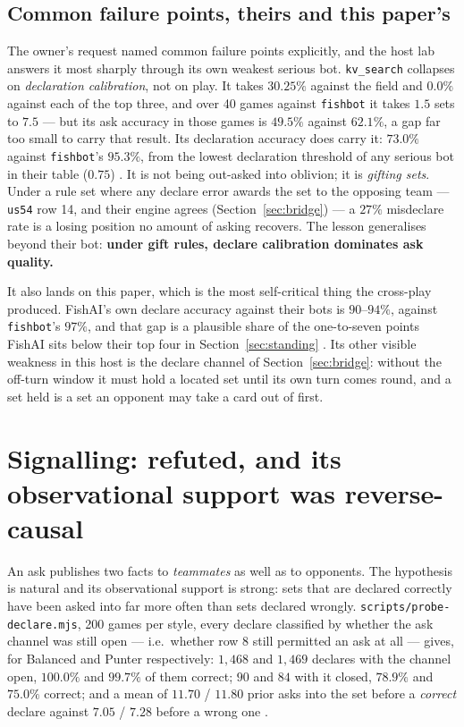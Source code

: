 \documentclass[11pt]{article}
\newcommand{\code}[1]{\texttt{#1}}
\newcommand{\usff}{\code{us54}}
\begin{document}
\subsection{Common failure points, theirs and this paper's}
\label{sec:failures}

The owner's request named common failure points explicitly, and the host lab answers it most sharply
through its own weakest serious bot. \code{kv\_search} collapses on \emph{declaration calibration},
not on play. It takes $30.25\%$ against the field and $0.0\%$ against each of the top three, and
over 40 games against \code{fishbot} it takes $1.5$ sets to $7.5$ --- but its ask accuracy in those
games is $49.5\%$ against $62.1\%$, a gap far too small to carry that result. Its declaration
accuracy does carry it: $\mathbf{73.0\%}$ against \code{fishbot}'s $\mathbf{95.3\%}$, from the
lowest declaration threshold of any serious bot in their table ($0.75$) \cite{crossplay}. It is not
being out-asked into oblivion; it is \emph{gifting sets}. Under a rule set where any declare error
awards the set to the opposing team --- \usff{} row 14, and their engine agrees
(Section~\ref{sec:bridge}) --- a $27\%$ misdeclare rate is a losing position no amount of asking
recovers. The lesson generalises beyond their bot: \textbf{under gift rules, declare calibration
dominates ask quality.}

It also lands on this paper, which is the most self-critical thing the cross-play produced. FishAI's
own declare accuracy against their bots is $90$--$94\%$, against \code{fishbot}'s $97\%$, and that
gap is a plausible share of the one-to-seven points FishAI sits below their top four in
Section~\ref{sec:standing} \cite{crossplay}. Its other visible weakness in this host is the declare
channel of Section~\ref{sec:bridge}: without the off-turn window it must hold a located set until
its own turn comes round, and a set held is a set an opponent may take a card out of first.

\section{Signalling: refuted, and its observational support was reverse-causal}
\label{sec:signal}

An ask publishes two facts to \emph{teammates} as well as to opponents. The hypothesis is natural
and its observational support is strong: sets that are declared correctly have been asked into far
more often than sets declared wrongly. \code{scripts/probe-declare.mjs}, 200 games per style, every
declare classified by whether the ask channel was still open --- i.e.\ whether row 8 still permitted
an ask at all --- gives, for Balanced and Punter respectively: $1{,}468$ and $1{,}469$ declares with
the channel open, $\mathbf{100.0\%}$ and $\mathbf{99.7\%}$ of them correct; $90$ and $84$ with it
closed, $\mathbf{78.9\%}$ and $\mathbf{75.0\%}$ correct; and a mean of $11.70$ / $11.80$ prior asks
into the set before a \emph{correct} declare against $\mathbf{7.05}$ / $\mathbf{7.28}$ before a
wrong one \cite{concession}.
\end{document}
